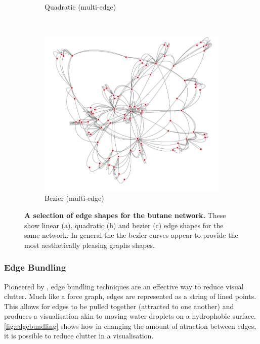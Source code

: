 \begin{figure}[H]
\begin{subfigure}[b]{.292\textheight}
     \caption{Quadratic (multi-edge)}
     \end{subfigure}\\
     \begin{subfigure}[b]{.292\textheight}
         \centering
     \includegraphics[width=\textwidth]{figures_c1/edgetype/multibeziergray.png}
     \caption{Bezier (multi-edge)}
     \end{subfigure}
        \caption{\textbf{A selection of edge shapes for the butane network.} These show linear (a), quadratic (b) and bezier (c) edge shapes for the same network. In general the the bezier curves appear to provide the most aesthetically pleasing graphs shapes.       }
      \label{fig:curvededge}
\end{figure}








\subsubsection{Edge Bundling }
Pioneered by \cite{bundlepioneer}, edge bundling techniques are an effective way to reduce visual clutter. Much like a force graph, edges are represented as a string of lined points. This allows for edges to be pulled together (attracted to one another) and produces a visualisation akin to moving water droplets on a hydrophobic surface. \autoref{fig:edgebundling} shows how in changing the amount of atraction between edges, it is possible to reduce clutter in a visualisation. 


